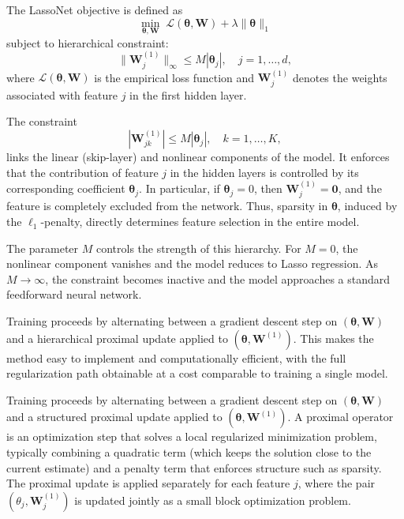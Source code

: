 The LassoNet objective is defined as
\begin{equation*}
\min_{\boldsymbol{\theta}, \mathbf{W}} \; \mathcal{L}(\boldsymbol{\theta}, \mathbf{W}) + \lambda \|\boldsymbol{\theta}\|_1
\end{equation*}
subject to hierarchical constraint:
\begin{equation*}
\|\mathbf{W}^{(1)}_j\|_{\infty} \leq M |\boldsymbol{\theta}_j|, \quad j = 1, \dots, d,
\end{equation*}
where $\mathcal{L}(\boldsymbol{\theta}, \mathbf{W})$ is the empirical loss function and $\mathbf{W}^{(1)}_j$ denotes the weights associated with feature $j$ in the first hidden layer.

The constraint
\begin{equation*}
|\mathbf{W}^{(1)}_{jk}| \leq M |\boldsymbol{\theta}_j|, \quad k = 1, \dots, K,
\end{equation*}
links the linear (skip-layer) and nonlinear components of the model. It enforces that the contribution of feature $j$ in the hidden layers is controlled by its corresponding coefficient $\boldsymbol{\theta}_j$. In particular, if $\boldsymbol{\theta}_j = 0$, then $\mathbf{W}^{(1)}_j = \mathbf{0}$, and the feature is completely excluded from the network. Thus, sparsity in $\boldsymbol{\theta}$, induced by the $\ell_1$-penalty, directly determines feature selection in the entire model.

The parameter $M$ controls the strength of this hierarchy. For $M = 0$, the nonlinear component vanishes and the model reduces to Lasso regression. As $M \to \infty$, the constraint becomes inactive and the model approaches a standard feedforward neural network.

Training proceeds by alternating between a gradient descent step on $(\boldsymbol{\theta}, \mathbf{W})$ and a hierarchical proximal update applied to $(\boldsymbol{\theta}, \mathbf{W}^{(1)})$. This makes the method easy to implement and computationally efficient, with the full regularization path obtainable at a cost comparable to training a single model.


Training proceeds by alternating between a gradient descent step on $(\boldsymbol{\theta}, \mathbf{W})$ and a structured proximal update applied to $(\boldsymbol{\theta}, \mathbf{W}^{(1)})$. A proximal operator is an optimization step that solves a local regularized minimization problem, typically combining a quadratic term (which keeps the solution close to the current estimate) and a penalty term that enforces structure such as sparsity. The proximal update is applied separately for each feature $j$, where the pair $(\theta_j, \mathbf{W}^{(1)}_j)$ is updated jointly as a small block optimization problem.

